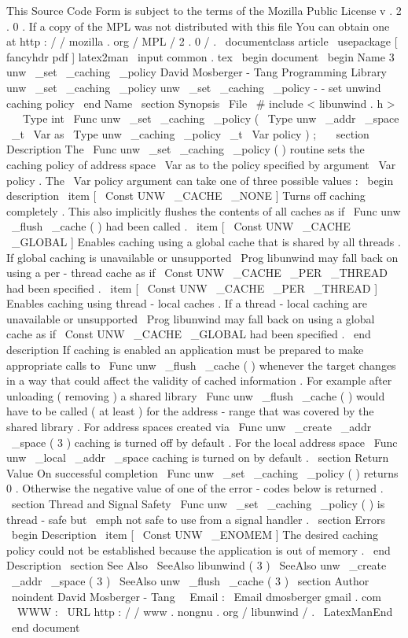 %
This
Source
Code
Form
is
subject
to
the
terms
of
the
Mozilla
Public
%
License
v
.
2
.
0
.
If
a
copy
of
the
MPL
was
not
distributed
with
this
%
file
You
can
obtain
one
at
http
:
/
/
mozilla
.
org
/
MPL
/
2
.
0
/
.
\
documentclass
{
article
}
\
usepackage
[
fancyhdr
pdf
]
{
latex2man
}
\
input
{
common
.
tex
}
\
begin
{
document
}
\
begin
{
Name
}
{
3
}
{
unw
\
_set
\
_caching
\
_policy
}
{
David
Mosberger
-
Tang
}
{
Programming
Library
}
{
unw
\
_set
\
_caching
\
_policy
}
unw
\
_set
\
_caching
\
_policy
-
-
set
unwind
caching
policy
\
end
{
Name
}
\
section
{
Synopsis
}
\
File
{
\
#
include
<
libunwind
.
h
>
}
\
\
\
Type
{
int
}
\
Func
{
unw
\
_set
\
_caching
\
_policy
}
(
\
Type
{
unw
\
_addr
\
_space
\
_t
}
\
Var
{
as
}
\
Type
{
unw
\
_caching
\
_policy
\
_t
}
\
Var
{
policy
}
)
;
\
\
\
section
{
Description
}
The
\
Func
{
unw
\
_set
\
_caching
\
_policy
}
(
)
routine
sets
the
caching
policy
of
address
space
\
Var
{
as
}
to
the
policy
specified
by
argument
\
Var
{
policy
}
.
The
\
Var
{
policy
}
argument
can
take
one
of
three
possible
values
:
\
begin
{
description
}
\
item
[
\
Const
{
UNW
\
_CACHE
\
_NONE
}
]
Turns
off
caching
completely
.
This
also
implicitly
flushes
the
contents
of
all
caches
as
if
\
Func
{
unw
\
_flush
\
_cache
}
(
)
had
been
called
.
\
item
[
\
Const
{
UNW
\
_CACHE
\
_GLOBAL
}
]
Enables
caching
using
a
global
cache
that
is
shared
by
all
threads
.
If
global
caching
is
unavailable
or
unsupported
\
Prog
{
libunwind
}
may
fall
back
on
using
a
per
-
thread
cache
as
if
\
Const
{
UNW
\
_CACHE
\
_PER
\
_THREAD
}
had
been
specified
.
\
item
[
\
Const
{
UNW
\
_CACHE
\
_PER
\
_THREAD
}
]
Enables
caching
using
thread
-
local
caches
.
If
a
thread
-
local
caching
are
unavailable
or
unsupported
\
Prog
{
libunwind
}
may
fall
back
on
using
a
global
cache
as
if
\
Const
{
UNW
\
_CACHE
\
_GLOBAL
}
had
been
specified
.
\
end
{
description
}
If
caching
is
enabled
an
application
must
be
prepared
to
make
appropriate
calls
to
\
Func
{
unw
\
_flush
\
_cache
}
(
)
whenever
the
target
changes
in
a
way
that
could
affect
the
validity
of
cached
information
.
For
example
after
unloading
(
removing
)
a
shared
library
\
Func
{
unw
\
_flush
\
_cache
}
(
)
would
have
to
be
called
(
at
least
)
for
the
address
-
range
that
was
covered
by
the
shared
library
.
For
address
spaces
created
via
\
Func
{
unw
\
_create
\
_addr
\
_space
}
(
3
)
caching
is
turned
off
by
default
.
For
the
local
address
space
\
Func
{
unw
\
_local
\
_addr
\
_space
}
caching
is
turned
on
by
default
.
\
section
{
Return
Value
}
On
successful
completion
\
Func
{
unw
\
_set
\
_caching
\
_policy
}
(
)
returns
0
.
Otherwise
the
negative
value
of
one
of
the
error
-
codes
below
is
returned
.
\
section
{
Thread
and
Signal
Safety
}
\
Func
{
unw
\
_set
\
_caching
\
_policy
}
(
)
is
thread
-
safe
but
\
emph
{
not
}
safe
to
use
from
a
signal
handler
.
\
section
{
Errors
}
\
begin
{
Description
}
\
item
[
\
Const
{
UNW
\
_ENOMEM
}
]
The
desired
caching
policy
could
not
be
established
because
the
application
is
out
of
memory
.
\
end
{
Description
}
\
section
{
See
Also
}
\
SeeAlso
{
libunwind
(
3
)
}
\
SeeAlso
{
unw
\
_create
\
_addr
\
_space
(
3
)
}
\
SeeAlso
{
unw
\
_flush
\
_cache
(
3
)
}
\
section
{
Author
}
\
noindent
David
Mosberger
-
Tang
\
\
Email
:
\
Email
{
dmosberger
gmail
.
com
}
\
\
WWW
:
\
URL
{
http
:
/
/
www
.
nongnu
.
org
/
libunwind
/
}
.
\
LatexManEnd
\
end
{
document
}
